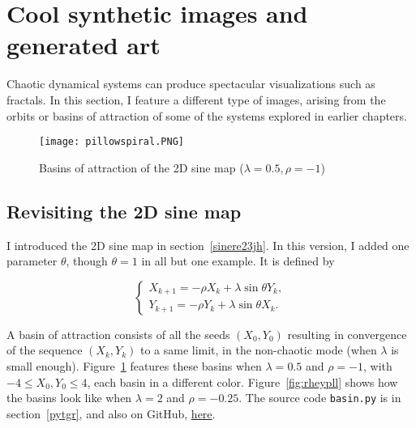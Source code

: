 \documentclass[oneside,10pt]{book}
\begin{document}


\section{Cool synthetic images and generated art}\label{2dsinemp}

Chaotic dynamical systems can produce spectacular visualizations such as fractals. In this section, I feature a different type of images, arising
 from the orbits or basins of attraction of some of the systems explored in earlier chapters.

\begin{figure}[H]
\centering
\texttt{[image: pillowspiral.PNG]} %
\caption{Basins of attraction of the 2D sine map ($\lambda=0.5,\rho=-1$)}
\label{gholdust}
\end{figure}

\subsection{Revisiting the 2D sine map}

I introduced the 2D sine map in section~\ref{sinere23jh}. In this version, I added one parameter $\theta$,
 though $\theta=1$ in all but one example. It is defined by

\begin{equation}
    \begin{cases}
      X_{k+1} = -\rho X_k + \lambda \sin \theta Y_k, \\[3pt]
     Y_{k+1} = -\rho Y_k + \lambda \sin \theta X_k. \label{gfda}
    \end{cases} %
\end{equation}

A \textcolor{index}{basin of attraction} consists of all the seeds $(X_0,Y_0)$ resulting in convergence
 of the sequence $(X_k,Y_k)$ to a same limit, in the non-chaotic mode (when $\lambda$ is small enough).
 Figure~\ref{gholdust} features these basins when $\lambda=0.5$ and $\rho=-1$, with $-4\leq X_0,Y_0\leq 4$, each basin in a different color. Figure~\ref{fig:rheypll} shows how the basins look like when $\lambda=2$ and $\rho=-0.25$.
The source code \texttt{basin.py} is in section~\ref{pytgr}, and also on GitHub, \href{https://github.com/VincentGranville/Stochastic-Processes/blob/master/basin.py}{here}.
\end{document}
